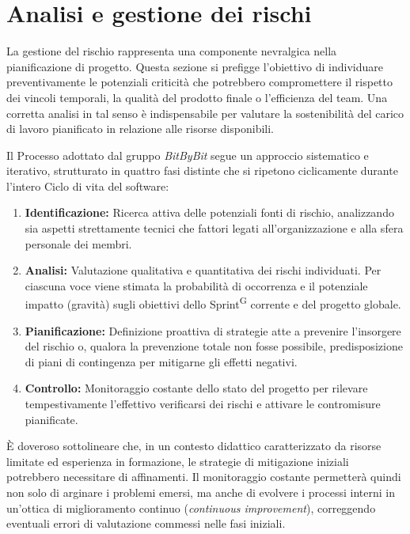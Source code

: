 \documentclass[a4paper,12pt]{article}
\begin{document}
\section{Analisi e gestione dei rischi} \label{sec:analisi_rischi}
La gestione del rischio rappresenta una componente nevralgica nella pianificazione di progetto. Questa sezione si prefigge l'obiettivo di individuare preventivamente le potenziali criticità che potrebbero compromettere il rispetto dei vincoli temporali, la qualità del prodotto finale o l'efficienza del team. Una corretta analisi in tal senso è indispensabile per valutare la sostenibilità del carico di lavoro pianificato in relazione alle risorse disponibili.

Il Processo adottato dal gruppo \textit{BitByBit} segue un approccio sistematico e iterativo, strutturato in quattro fasi distinte che si ripetono ciclicamente durante l'intero Ciclo di vita del software:

\begin{enumerate}
    \item \textbf{Identificazione:} Ricerca attiva delle potenziali fonti di rischio, analizzando sia aspetti strettamente tecnici che fattori legati all'organizzazione e alla sfera personale dei membri.
    \item \textbf{Analisi:} Valutazione qualitativa e quantitativa dei rischi individuati. Per ciascuna voce viene stimata la probabilità di occorrenza e il potenziale impatto (gravità) sugli obiettivi dello Sprint\textsuperscript{G} corrente e del progetto globale.
    \item \textbf{Pianificazione:} Definizione proattiva di strategie atte a prevenire l'insorgere del rischio o, qualora la prevenzione totale non fosse possibile, predisposizione di piani di contingenza per mitigarne gli effetti negativi.
    \item \textbf{Controllo:} Monitoraggio costante dello stato del progetto per rilevare tempestivamente l'effettivo verificarsi dei rischi e attivare le contromisure pianificate.
\end{enumerate}

È doveroso sottolineare che, in un contesto didattico caratterizzato da risorse limitate ed esperienza in formazione, le strategie di mitigazione iniziali potrebbero necessitare di affinamenti. Il monitoraggio costante permetterà quindi non solo di arginare i problemi emersi, ma anche di evolvere i processi interni in un'ottica di miglioramento continuo (\textit{continuous improvement}), correggendo eventuali errori di valutazione commessi nelle fasi iniziali.
\end{document}
